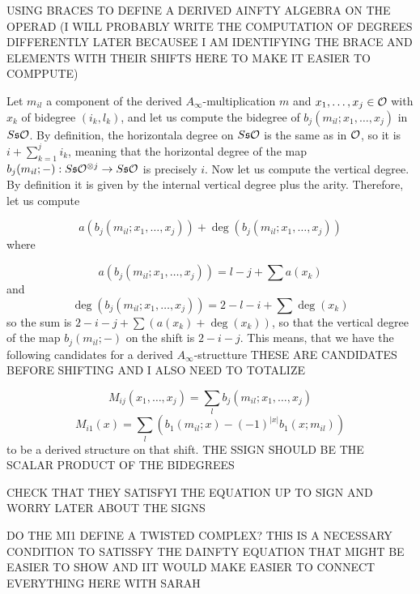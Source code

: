 \documentclass[twoside]{article}
\begin{document}
 USING BRACES TO DEFINE A DERIVED AINFTY ALGEBRA ON THE OPERAD (I WILL PROBABLY  WRITE THE COMPUTATION OF DEGREES DIFFERENTLY LATER BECAUSEE I AM IDENTIFYING THE BRACE AND ELEMENTS WITH THEIR SHIFTS HERE TO MAKE IT EASIER TO COMPPUTE)

Let $m_{il}$ a component of the derived $A_\infty$-multiplication $m$ and $x_1,\dots, x_j\in{\mathcal O}$ with $x_k$ of bidegree $(i_k,l_k)$, and let us compute the bidegree of $b_j(m_{il};x_1,\dots, x_j)$ in $S\mathfrak{s}{\mathcal O}$. By definition, the horizontala degree on $S\mathfrak{s}{\mathcal O}$ is the same as in ${\mathcal O}$, so it is $i+\sum_{k=1}^ji_k$, meaning that the horizontal degree of the map $b_j(m_{il};-):S\mathfrak{s}{\mathcal O}^{\otimes j}\to S\mathfrak{s}{\mathcal O}$ is precisely $i$. Now let us compute the vertical degree. By definition it is given by the internal vertical degree plus the arity. Therefore, let us compute

\[
a(b_j(m_{il};x_1,\dots, x_j))+\deg(b_j(m_{il};x_1,\dots, x_j))
\]
where

\[
a(b_j(m_{il};x_1,\dots, x_j))=l-j+\sum a(x_k)
\]
and 
\[\deg(b_j(m_{il};x_1,\dots, x_j))=2-l-i+\sum \deg(x_k)\]
so the sum is $2-i-j+\sum (a(x_k)+\deg(x_k))$, so that the vertical degree of the map $b_j(m_{il};-)$ on the shift is $2-i-j$. This means, that we have the following candidates for a derived $A_\infty$-structture
THESE ARE CANDIDATES BEFORE SHIFTING  AND I ALSO NEED TO TOTALIZE

\[M_{ij}(x_1,\dots, x_j)=\sum_l b_j(m_{il};x_1,\dots, x_j)\]
\[M_{i1}(x)= \sum_l (b_1(m_{il};x)-(-1)^{|x|}b_1(x;m_{il}))\]
to be a derived structure on that shift. THE SSIGN SHOULD BE THE SCALAR PRODUCT OF THE BIDEGREES

CHECK THAT THEY SATISFYI THE EQUATION UP TO SIGN AND WORRY LATER ABOUT THE SIGNS

DO THE MI1 DEFINE A TWISTED COMPLEX? THIS IS A NECESSARY CONDITION TO SATISSFY THE DAINFTY EQUATION THAT MIGHT BE EASIER TO SHOW AND IIT WOULD MAKE EASIER TO CONNECT EVERYTHING HERE WITH SARAH
\end{document}
